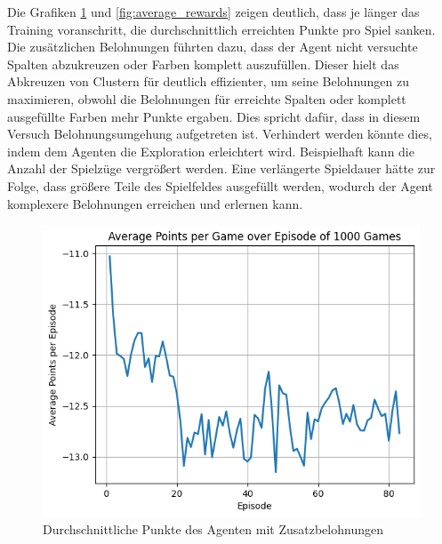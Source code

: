Die  Grafiken \ref{fig:average_points} und \ref{fig:average_rewards} zeigen deutlich, dass je länger das Training voranschritt, die durchschnittlich erreichten Punkte pro Spiel sanken.
Die zusätzlichen Belohnungen führten dazu, dass der Agent nicht versuchte Spalten abzukreuzen oder Farben komplett auszufüllen. Dieser hielt das Abkreuzen von Clustern für deutlich effizienter, um seine Belohnungen zu maximieren, obwohl die Belohnungen für erreichte Spalten oder komplett ausgefüllte Farben mehr Punkte ergaben. Dies spricht dafür, dass in diesem Versuch Belohnungsumgehung aufgetreten ist. Verhindert werden könnte dies, indem dem Agenten die Exploration erleichtert wird. Beispielhaft kann die Anzahl der Spielzüge vergrößert werden.
Eine verlängerte Spieldauer hätte zur Folge, dass größere Teile des Spielfeldes ausgefüllt werden, wodurch der Agent komplexere Belohnungen erreichen und erlernen kann. 
\begin{figure}[!h]
    \centering
    \includegraphics[scale=0.6]{Bilder/average_points.png}
    \caption{Durchschnittliche Punkte des Agenten mit Zusatzbelohnungen}
    \label{fig:average_points}
\end{figure}

